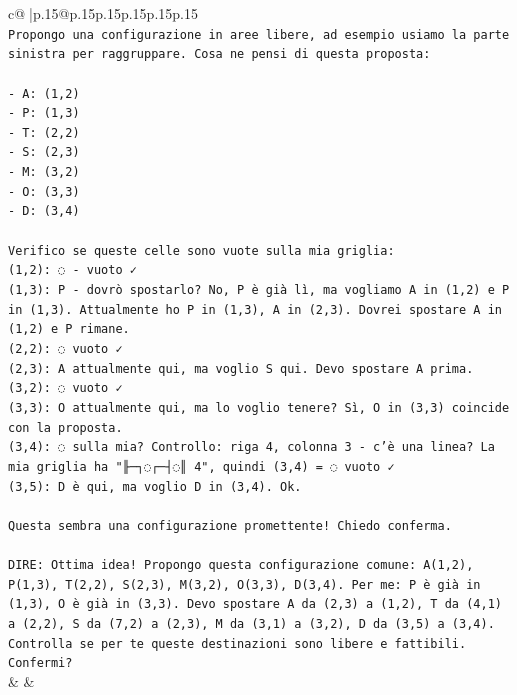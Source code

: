 \documentclass{article}
\begin{document}
{\begin{supertabular}{c@{$\;$}|p{.15\linewidth}@{}p{.15\linewidth}p{.15\linewidth}p{.15\linewidth}p{.15\linewidth}p{.15\linewidth}}
{{{\\ 
\texttt{Propongo una configurazione in aree libere, ad esempio usiamo la parte sinistra per raggruppare. Cosa ne pensi di questa proposta:} \\
\\ 
\texttt{{-} A: (1,2)} \\
\texttt{{-} P: (1,3)} \\
\texttt{{-} T: (2,2)} \\
\texttt{{-} S: (2,3)} \\
\texttt{{-} M: (3,2)} \\
\texttt{{-} O: (3,3)} \\
\texttt{{-} D: (3,4)} \\
\\ 
\texttt{Verifico se queste celle sono vuote sulla mia griglia:} \\
\texttt{(1,2): ◌ {-} vuoto ✓} \\
\texttt{(1,3): P {-} dovrò spostarlo? No, P è già lì, ma vogliamo A in (1,2) e P in (1,3). Attualmente ho P in (1,3), A in (2,3). Dovrei spostare A in (1,2) e P rimane.} \\
\texttt{(2,2): ◌ vuoto ✓} \\
\texttt{(2,3): A attualmente qui, ma voglio S qui. Devo spostare A prima.} \\
\texttt{(3,2): ◌ vuoto ✓} \\
\texttt{(3,3): O attualmente qui, ma lo voglio tenere? Sì, O in (3,3) coincide con la proposta.} \\
\texttt{(3,4): ◌ sulla mia? Controllo: riga 4, colonna 3 {-} c'è una linea? La mia griglia ha "╟─┐◌┌─┤◌║ 4", quindi (3,4) = ◌ vuoto ✓} \\
\texttt{(3,5): D è qui, ma voglio D in (3,4). Ok.} \\
\\ 
\texttt{Questa sembra una configurazione promettente! Chiedo conferma.} \\
\\ 
\texttt{DIRE: Ottima idea! Propongo questa configurazione comune: A(1,2), P(1,3), T(2,2), S(2,3), M(3,2), O(3,3), D(3,4). Per me: P è già in (1,3), O è già in (3,3). Devo spostare A da (2,3) a (1,2), T da (4,1) a (2,2), S da (7,2) a (2,3), M da (3,1) a (3,2), D da (3,5) a (3,4). Controlla se per te queste destinazioni sono libere e fattibili. Confermi?} \\
            }
        }
    }
    & & \\ \\


\end{supertabular}}
\end{document}
